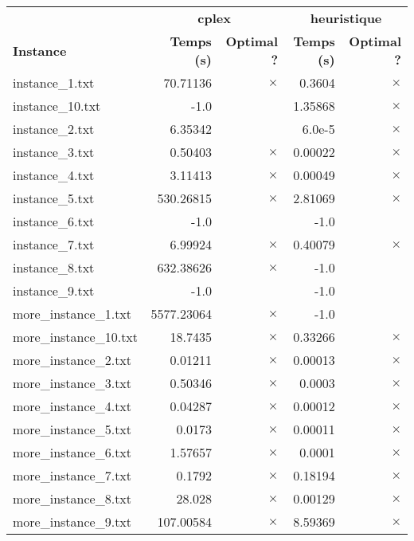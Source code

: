 \documentclass{article}
\begin{document}
\begin{center}
\renewcommand{\arraystretch}{1.4} 
 \begin{tabular}{lrrrr}
	\hline
 & \multicolumn{2}{c}{\textbf{cplex}} & \multicolumn{2}{c}{\textbf{heuristique}}\\
\textbf{Instance}  & \textbf{Temps (s)} & \textbf{Optimal ?}  & \textbf{Temps (s)} & \textbf{Optimal ?} \\\hline

instance\_1.txt & 70.71136 & 
$\times$
 & 0.3604 & 
$\times$
\\
instance\_10.txt & -1.0 & 
 & 1.35868 & 
$\times$
\\
instance\_2.txt & 6.35342 & 
 & 6.0e-5 & 
$\times$
\\
instance\_3.txt & 0.50403 & 
$\times$
 & 0.00022 & 
$\times$
\\
instance\_4.txt & 3.11413 & 
$\times$
 & 0.00049 & 
$\times$
\\
instance\_5.txt & 530.26815 & 
$\times$
 & 2.81069 & 
$\times$
\\
instance\_6.txt & -1.0 & 
 & -1.0 & 
\\
instance\_7.txt & 6.99924 & 
$\times$
 & 0.40079 & 
$\times$
\\
instance\_8.txt & 632.38626 & 
$\times$
 & -1.0 & 
\\
instance\_9.txt & -1.0 & 
 & -1.0 & 
\\
more\_instance\_1.txt & 5577.23064 & 
$\times$
 & -1.0 & 
\\
more\_instance\_10.txt & 18.7435 & 
$\times$
 & 0.33266 & 
$\times$
\\
more\_instance\_2.txt & 0.01211 & 
$\times$
 & 0.00013 & 
$\times$
\\
more\_instance\_3.txt & 0.50346 & 
$\times$
 & 0.0003 & 
$\times$
\\
more\_instance\_4.txt & 0.04287 & 
$\times$
 & 0.00012 & 
$\times$
\\
more\_instance\_5.txt & 0.0173 & 
$\times$
 & 0.00011 & 
$\times$
\\
more\_instance\_6.txt & 1.57657 & 
$\times$
 & 0.0001 & 
$\times$
\\
more\_instance\_7.txt & 0.1792 & 
$\times$
 & 0.18194 & 
$\times$
\\
more\_instance\_8.txt & 28.028 & 
$\times$
 & 0.00129 & 
$\times$
\\
more\_instance\_9.txt & 107.00584 & 
$\times$
 & 8.59369 & 
$\times$
\\
\hline\end{tabular}
\end{center}
\end{document}
